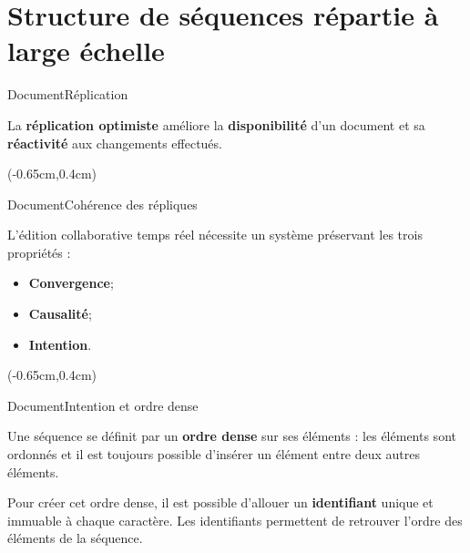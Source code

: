 \section{Structure de séquences répartie à large échelle}


\begin{frame}{Document}{Réplication}
  \vspace{-1.5cm}

  La \textbf{réplication optimiste} améliore
  la \textbf{disponibilité} d'un document et sa \textbf{réactivité} aux
  changements effectués.  \vspace{0.75cm}

  \begin{textblock*}{\textwidth}(-0.65cm,0.4cm) 
    
  \end{textblock*}
  
  \vspace{1cm}

\end{frame}


\begin{frame}{Document}{Cohérence des répliques}
  
  \vspace{-1.5cm}

  L'édition collaborative temps réel nécessite un système préservant les trois
  propriétés :

  \begin{itemize}
  \item \textbf{Convergence};
  \item \textbf{Causalité};
  \item \textbf{Intention}.  
  \end{itemize}

  \begin{textblock*}{\textwidth}(-0.65cm,0.4cm) 
    
  \end{textblock*}

\end{frame}


\begin{frame}{Document}{Intention et ordre dense}
  
  \vspace{0.5cm}

  Une séquence se définit par un \textbf{ordre dense} sur ses éléments : les
  éléments sont ordonnés et il est toujours possible d'insérer un élément entre
  deux autres éléments.

  \vspace{0.75cm}

  Pour créer cet ordre dense, il est possible d'allouer un \textbf{identifiant}
  unique et immuable à chaque caractère. Les
  identifiants permettent de retrouver l'ordre des éléments de la séquence.
  
  

  
\end{frame}

